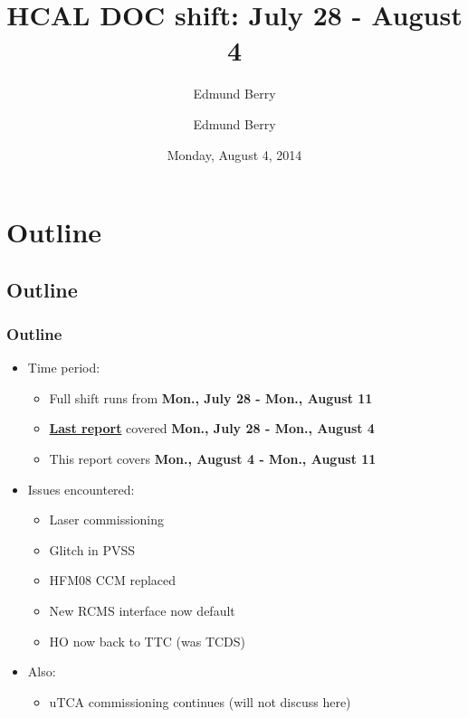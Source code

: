 \documentclass[bigger]{beamer}
\title{HCAL DOC shift: July 28 - August 4}
\author{Edmund Berry}
\date{Monday, August 4, 2014}
\author[Edmund Berry]{\alert{Edmund Berry}}
\providecommand{\alert}[1]{\textbf{#1}}
\begin{document}
\maketitle


\section{Outline}
\label{sec-1}
\subsection{Outline}
\label{sec-1-1}
\begin{frame}
\frametitle{Outline}
\label{sec-1-1-1}
\begin{itemize}

\item Time period:
\label{sec-1-1-1-1}%
\begin{itemize}

\item Full shift runs from \alert{Mon., July 28 - Mon., August 11}
\label{sec-1-1-1-1-1}%

\item \href{https://indico.cern.ch/event/328809/contribution/6/material/0/0.pdf}{\alert{Last report}} covered \alert{Mon., July 28 - Mon., August 4}
\label{sec-1-1-1-1-2}%

\item This report covers \alert{Mon., August 4 - Mon., August 11}
\label{sec-1-1-1-1-3}%
\end{itemize} %

\item Issues encountered:
\label{sec-1-1-1-2}%
\begin{itemize}

\item Laser commissioning
\label{sec-1-1-1-2-1}%

\item Glitch in PVSS
\label{sec-1-1-1-2-2}%

\item HFM08 CCM replaced
\label{sec-1-1-1-2-3}%

\item New RCMS interface now default
\label{sec-1-1-1-2-4}%

\item HO now back to TTC (was TCDS)
\label{sec-1-1-1-2-5}%
\end{itemize} %

\item Also:
\label{sec-1-1-1-3}%
\begin{itemize}

\item uTCA commissioning continues (will not discuss here)
\label{sec-1-1-1-3-1}%
\end{itemize} %
\end{itemize} %
\end{frame}
\end{document}
